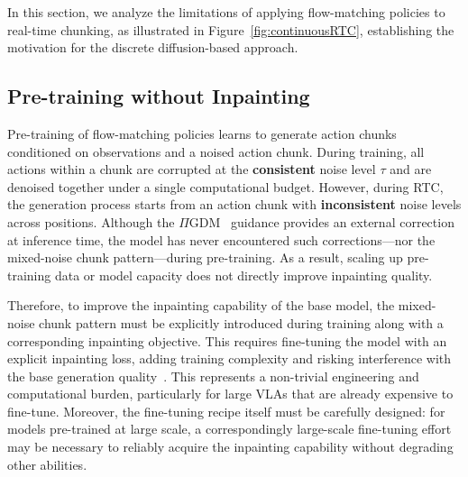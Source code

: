\documentclass{article}
\begin{document}
In this section, we analyze the limitations of applying flow-matching policies to real-time chunking, as illustrated in Figure~\ref{fig:continuousRTC}, establishing the motivation for the discrete diffusion-based approach.


\newpage
\subsection{Pre-training without Inpainting}
\label{sec:lim_pretrain}

Pre-training of flow-matching policies learns to generate action chunks conditioned on observations and a noised action chunk.
During training, all actions within a chunk are corrupted at the \textbf{consistent} noise level $\tau$ and are denoised together under a single computational budget.
However, during RTC, the generation process starts from an action chunk with \textbf{inconsistent} noise levels across positions.
Although the $\Pi$GDM~\citep{song2023pseudoinverse} guidance provides an external correction at inference time, the model has never encountered such corrections---nor the mixed-noise chunk pattern---during pre-training.
As a result, scaling up pre-training data or model capacity does not directly improve inpainting quality.


Therefore, to improve the inpainting capability of the base model, the mixed-noise chunk pattern must be explicitly introduced during training along with a corresponding inpainting objective.
This requires fine-tuning the model with an explicit inpainting loss, adding training complexity and risking interference with the base generation quality~\citep{black2025training, wang2026real}.
This represents a non-trivial engineering and computational burden, particularly for large VLAs that are already expensive to fine-tune.
Moreover, the fine-tuning recipe itself must be carefully designed: for models pre-trained at large scale, a correspondingly large-scale fine-tuning effort may be necessary to reliably acquire the inpainting capability without degrading other abilities.
\end{document}
